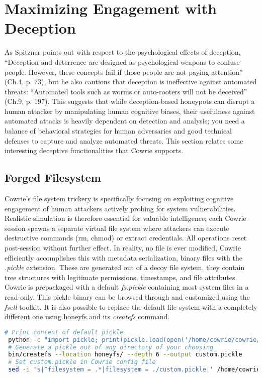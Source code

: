\documentclass{cls/ULBreport}
\begin{document}
    \section{Maximizing Engagement with Deception}

As Spitzner points out with respect to the psychological effects of deception, \enquote{Deception and deterrence are designed as psychological weapons to confuse
people. However, these concepts fail if those people are not paying attention} (Ch.4, p. 73), but he also cautions that deception is ineffective against automated threats: \enquote{Automated tools such as worms or auto-rooters will not be deceived} (Ch.9, p. 197). This suggests that while deception-based honeypots can disrupt a human attacker by manipulating human cognitive biases, their usefulness against automated attacks is heavily dependent on detection and analysis; you need a balance of behavioral strategies for human adversaries and good technical defenses to capture and analyze automated threats. This section relates some interesting deceptive functionalities that Cowrie supports.

    \subsection{Forged Filesystem}
Cowrie's file system trickery is specifically focusing on exploiting cognitive engagement of human attackers actively probing for system vulnerabilities. Realistic simulation is therefore essential for valuable intelligence; each Cowrie session spawns a separate virtual file system where attackers can execute destructive commands (rm, chmod) or extract credentials. All operations reset post-session without further effect. In reality, no file is ever modified, Cowrie efficiently accomplishes this with metadata serialization, binary files with the \textit{.pickle} extension. These are generated out of a decoy file system, they contain tree structures with legitimate permissions, timestamps, and file attributes. Cowrie is prepackaged with a default \textit{fs.pickle} containing most system files in a read-only. This pickle binary can be browsed through and customized using the \textit{fsctl} toolkit. It is also possible to replace the default file system with a completely different one using \href{https://github.com/cowrie/cowrie/blob/main/docs/HONEYFS.rst}{honeyfs} and its \textit{createfs} command.
 \begin{lstlisting}[language=bash,caption={Deceptive Filesystem Manipulation}]
 # Print content of default pickle 
 python -c "import pickle; print(pickle.load(open('/home/cowrie/cowrie/data/fs.pickle','rb')))" 
 # Generate a pickle out of any directory of your choosing
 bin/createfs --location honeyfs/ --depth 6 --output custom.pickle  
 # Set custom.pickle in Cowrie config file 
 sed -i 's|^filesystem = .*|filesystem = ./custom.pickle|' /home/cowrie/cowrie/etc/cowrie.cfg\end{lstlisting}
\end{document}
